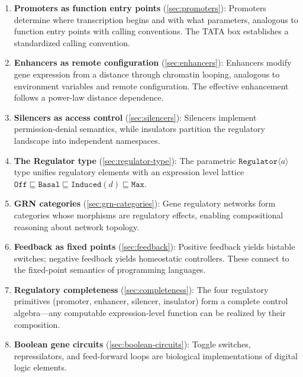 \documentclass[12pt,a4paper]{article}
\newcommand{\Reg}[1]{\texttt{Regulator}\ensuremath{\langle}#1\ensuremath{\rangle}}
\begin{document}
\begin{enumerate}
  \item \textbf{Promoters as function entry points} (\cref{sec:promoters}): Promoters determine where transcription begins and with what parameters, analogous to function entry points with calling conventions.  The TATA box establishes a standardized calling convention.

  \item \textbf{Enhancers as remote configuration} (\cref{sec:enhancers}): Enhancers modify gene expression from a distance through chromatin looping, analogous to environment variables and remote configuration.  The effective enhancement follows a power-law distance dependence.

  \item \textbf{Silencers as access control} (\cref{sec:silencers}): Silencers implement permission-denial semantics, while insulators partition the regulatory landscape into independent namespaces.

  \item \textbf{The Regulator type} (\cref{sec:regulator-type}): The parametric $\Reg{a}$ type unifies regulatory elements with an expression level lattice $\texttt{Off} \sqsubseteq \texttt{Basal} \sqsubseteq \texttt{Induced}(d) \sqsubseteq \texttt{Max}$.

  \item \textbf{GRN categories} (\cref{sec:grn-categories}): Gene regulatory networks form categories whose morphisms are regulatory effects, enabling compositional reasoning about network topology.

  \item \textbf{Feedback as fixed points} (\cref{sec:feedback}): Positive feedback yields bistable switches; negative feedback yields homeostatic controllers.  These connect to the fixed-point semantics of programming languages.

  \item \textbf{Regulatory completeness} (\cref{sec:completeness}): The four regulatory primitives (promoter, enhancer, silencer, insulator) form a complete control algebra---any computable expression-level function can be realized by their composition.

  \item \textbf{Boolean gene circuits} (\cref{sec:boolean-circuits}): Toggle switches, repressilators, and feed-forward loops are biological implementations of digital logic elements.
\end{enumerate}
\end{document}
